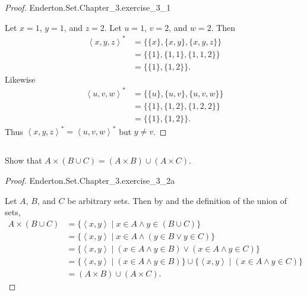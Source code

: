 \documentclass{report}
\newcommand{\pair}[1]{\left< #1 \right>}
\begin{document}
\begin{proof}

    {Enderton.Set.Chapter\_3.exercise\_3\_1}

  Let $x = 1$, $y = 1$, and $z = 2$.
  Let $u = 1$, $v = 2$, and $w = 2$.
  Then
    \begin{align*}
      \pair{x, y, z}^*
        & = \{\{x\}, \{x, y\}, \{x, y, z\}\} \\
        & = \{\{1\}, \{1, 1\}, \{1, 1, 2\}\} \\
        & = \{\{1\}, \{1, 2\}\}.
    \end{align*}
  Likewise
    \begin{align*}
      \pair{u, v, w}^*
        & = \{\{u\}, \{u, v\}, \{u, v, w\}\} \\
        & = \{\{1\}, \{1, 2\}, \{1, 2, 2\}\} \\
        & = \{\{1\}, \{1, 2\}\}.
    \end{align*}
  Thus $\pair{x, y, z}^* = \pair{u, v, w}^*$ but $y \neq v$.

\end{proof}

\subsection{}%

Show that $A \times (B \cup C) = (A \times B) \cup (A \times C)$.

\begin{proof}

    {Enderton.Set.Chapter\_3.exercise\_3\_2a}

  Let $A$, $B$, and $C$ be arbitrary sets.
  Then by  and the definition of the union of sets,
    \begin{align*}
      A \times (B \cup C)
        & = \{ \pair{x, y} \mid x \in A \land y \in (B \cup C) \} \\
        & = \{ \pair{x, y} \mid
          x \in A \land (y \in B \lor y \in C) \} \\
        & = \{ \pair{x, y} \mid
          (x \in A \land y \in B) \lor (x \in A \land y \in C) \} \\
        & = \{ \pair{x, y} \mid (x \in A \land y \in B) \} \cup
          \{ \pair{x, y} \mid (x \in A \land y \in C) \} \\
        & = (A \times B) \cup (A \times C).
    \end{align*}

\end{proof}
\end{document}
